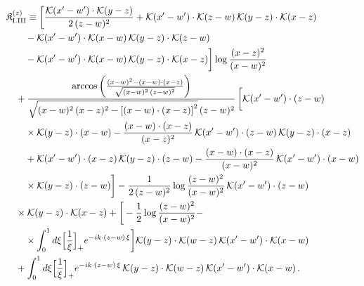 \begin{align}\label{eq:K-z_rm_I_III}
&\mathfrak{K}^{(z)}_{\rm I.III}\equiv \bigg[\frac{\mathcal{K}(x'-w')\cdot\mathcal{K}(y-z)}{2\,(z-w)^{2}} +\mathcal{K}(x'-w')\cdot\mathcal{K}(z-w)\, \mathcal{K}(y-z)\cdot\mathcal{K}(x-z)\notag\\
&\quad\quad -\mathcal{K}(x'-w')\cdot\mathcal{K}(x-w)\, \mathcal{K}(y-z)\cdot\mathcal{K}(z-w)\notag\\
&\quad\quad -\mathcal{K}(x'-w')\cdot\mathcal{K}(x-w)\, \mathcal{K}(y-z)\cdot\mathcal{K}(x-z)\bigg]\log\frac{(x-z)^{2}}{(x-w)^{2}}\notag\\
&\quad +\frac{\arccos\left(\frac{(x-w)^{2}-(x-w)\cdot (x-z)}{\sqrt{(x-w)^{2}\,(z-w)^{2}}}\right)}{\sqrt{(x-w)^{2}\,(x-z)^{2}-\left[(x-w)\cdot (x-z)\right]^{2}}\,(z-w)^{2}}\, \bigg[\mathcal{K}(x'-w')\cdot(z-w)\notag\\
&\quad\quad \times \mathcal{K}(y-z)\cdot(x-w) -\frac{(x-w)\cdot(x-z)}{(x-z)^{2}}\, \mathcal{K}(x'-w')\cdot(z-w)\, \mathcal{K}(y-z)\cdot(x-z)\notag\\
&\quad\quad +\mathcal{K}(x'-w')\cdot(x-z)\, \mathcal{K}(y-z)\cdot(z-w) -\frac{(x-w)\cdot(x-z)}{(x-w)^{2}}\, \mathcal{K}(x'-w')\cdot(x-w)\notag\\
&\quad\quad \times \mathcal{K}(y-z)\cdot(z-w)\bigg] -\frac{1}{2\,(z-w)^{2}}\log\frac{(z-w)^{2}}{(x-w)^{2}}\, \mathcal{K}(x'-w')\cdot(z-w)\notag\\
&\quad \times \mathcal{K}(y-z)\cdot\mathcal{K}(x-z) +\bigg[-\frac{1}{2}\log\frac{(z-w)^{2}}{(x-w)^{2}} -\notag\\
&\quad\quad \times \int_{0}^{1}d\xi\Big[\frac{1}{\xi}\Big]_{+}e^{-ik\cdot(z-w)\,\xi}\bigg]\mathcal{K}(y-z)\cdot\mathcal{K}(w-z)\, \mathcal{K}(x'-w')\cdot\mathcal{K}(x-w)\notag\\
&\quad + \int_{0}^{1}d\xi\Big[\frac{1}{\xi}\Big]_{+}e^{-ik\cdot(z-w)\,\xi}\, \mathcal{K}(y-z)\cdot\mathcal{K}(w-z)\, \mathcal{K}(x'-w')\cdot\mathcal{K}(x-w)\,.
\end{align}
